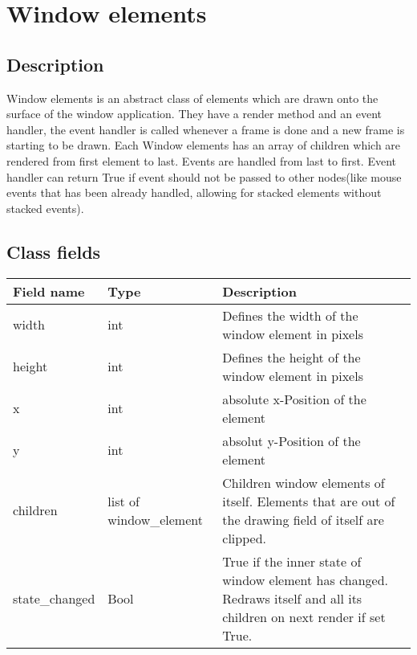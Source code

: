 \documentclass{scrartcl}
\begin{document}
    \section{Window elements}
    \subsection{Description}
    Window elements is an abstract class of elements which are drawn onto the surface of the window application. They have a render 
    method and an event handler, the event handler is called whenever a frame is done and a new frame is starting to be drawn. Each Window elements
    has an array of children which are rendered from first element to last. Events are handled from last to first. Event handler can return
    True if event should not be passed to other nodes(like mouse events that has been already handled, allowing for stacked elements without
    stacked events).
    \subsection{Class fields}
    \begin{tabular}{|p{}|p{}|p{}|}
        \hline
        Field name & Type & Description\\
        \hline
        width & int & Defines the width of the window element in pixels\\
        \hline
        height & int & Defines the height of the window element in pixels\\
        \hline
        x & int & absolute x-Position of the element\\
        \hline
        y & int & absolut y-Position of the element\\
        \hline
        children & list of window\_element & Children window elements of itself. Elements that are out of the drawing field of itself are clipped.\\
        \hline
        state\_changed & Bool & True if the inner state of window element has changed. Redraws itself and all its children on next render if set True.\\
        \hline
    \end{tabular}
\end{document}
